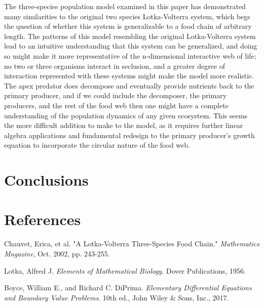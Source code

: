 \documentclass[11pt,oneside]{article}
\begin{document}
	The three-species population model examined in this paper has demonstrated many similarities to the original two species Lotka-Volterra system, which begs the question of whether this system is generalizable to a food chain of arbitrary length. The patterns of this model resembling the original Lotka-Volterra system lead to an intuitive understanding that this system can be generalized, and doing so might make it more representative of the n-dimensional interactive web of life; no two or three organisms interact in seclusion, and a greater degree of interaction represented with these systems might make the model more realistic. The apex predator does decompose and eventually provide nutrients back to the primary producer, and if we could include the decomposer, the primary producers, and the rest of the food web then one might have a complete understanding of the population dynamics of any given ecosystem. This seems the more difficult addition to make to the model, as it requires further linear algebra applications and fundamental redesign to the primary producer's growth equation to incorporate the circular nature of the food web.
	
	
	\section{Conclusions}
	
	\section{References}
	\begin{hangparas}{.25in}{1}
		Chauvet, Erica, et al. "A Lotka-Volterra Three-Species Food Chain." \textit{Mathematics Magazine}, Oct. 2002, pp. 243-255.
		
		Lotka, Alfred J. \textit{Elements of Mathematical Biology}. Dover Publications, 1956.
		
		Boyce, William E., and Richard C. DiPrima. \textit{Elementary Differential Equations and Boundary Value Problems}. 10th ed., John Wiley \& Sons, Inc., 2017.
		
		
	\end{hangparas}
	
\end{document}
